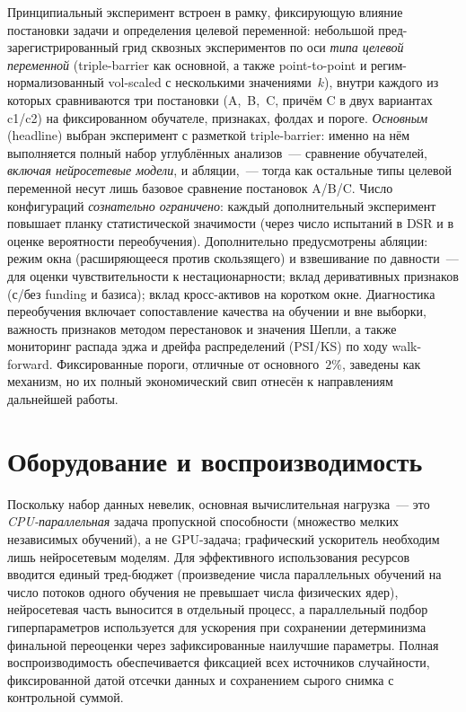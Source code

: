 \documentclass[12pt,a4paper]{report}
\begin{document}
Принципиальный эксперимент встроен в рамку, фиксирующую влияние постановки задачи и
определения целевой переменной: небольшой пред-зарегистрированный грид сквозных
экспериментов по оси \emph{типа целевой переменной} (triple-barrier как основной,
а также point-to-point и регим-нормализованный vol-scaled с несколькими
значениями~$k$), внутри каждого из которых сравниваются три постановки (A,~B,~C,
причём C в двух вариантах c1/c2) на фиксированном обучателе, признаках, фолдах и
пороге. \emph{Основным} (headline) выбран эксперимент с разметкой triple-barrier:
именно на нём выполняется полный набор углублённых анализов~--- сравнение обучателей,
\emph{включая нейросетевые модели}, и абляции,~--- тогда как остальные типы целевой
переменной несут лишь базовое сравнение постановок A/B/C. Число конфигураций
\emph{сознательно ограничено}: каждый дополнительный эксперимент повышает планку
статистической значимости (через число испытаний в DSR и в оценке вероятности
переобучения). Дополнительно предусмотрены абляции: режим окна (расширяющееся против
скользящего) и взвешивание по давности~--- для оценки чувствительности к
нестационарности; вклад деривативных признаков (с/без funding и базиса); вклад
кросс-активов на коротком окне. Диагностика переобучения включает сопоставление
качества на обучении и вне выборки, важность признаков методом перестановок и
значения Шепли, а также мониторинг распада эджа и дрейфа распределений (PSI/KS) по
ходу walk-forward. Фиксированные пороги, отличные от основного~$2\%$, заведены как
механизм, но их полный экономический свип отнесён к направлениям дальнейшей работы.

\section{Оборудование и воспроизводимость}

Поскольку набор данных невелик, основная вычислительная нагрузка~--- это
\emph{CPU-параллельная} задача пропускной способности (множество мелких независимых
обучений), а не GPU-задача; графический ускоритель необходим лишь нейросетевым
моделям. Для эффективного использования ресурсов вводится единый тред-бюджет
(произведение числа параллельных обучений на число потоков одного обучения не
превышает числа физических ядер), нейросетевая часть выносится в отдельный процесс,
а параллельный подбор гиперпараметров используется для ускорения при сохранении
детерминизма финальной переоценки через зафиксированные наилучшие параметры. Полная
воспроизводимость обеспечивается фиксацией всех источников случайности, фиксированной
датой отсечки данных и сохранением сырого снимка с контрольной суммой.
\end{document}
